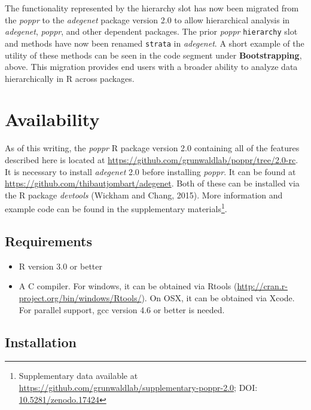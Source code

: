 \documentclass{frontiersSCNS} %
\begin{document}
The functionality represented by the hierarchy slot has now been
migrated from the \emph{poppr} to the \emph{adegenet} package version
2.0 to allow hierarchical analysis in \emph{adegenet}, \emph{poppr}, and
other dependent packages. The prior \emph{poppr} \texttt{hierarchy} slot
and methods have now been renamed \texttt{strata} in \emph{adegenet}. A
short example of the utility of these methods can be seen in the code
segment under \textbf{Bootstrapping}, above. This migration provides end
users with a broader ability to analyze data hierarchically in R across
packages.

\section*{Availability}\label{availability}

As of this writing, the \emph{poppr} R package version 2.0 containing
all of the features described here is located at
\url{https://github.com/grunwaldlab/poppr/tree/2.0-rc}. It is necessary
to install \emph{adegenet} 2.0 before installing \emph{poppr}. It can be
found at \url{https://github.com/thibautjombart/adegenet}. Both of these
can be installed via the R package \emph{devtools} (Wickham and Chang,
2015). More information and example code can be found in the
supplementary materials\footnote{Supplementary data available at
  \url{https://github.com/grunwaldlab/supplementary-poppr-2.0}; DOI:
  \href{http://dx.doi.org/10.5281/zenodo.17424}{10.5281/zenodo.17424}}.

\subsection*{Requirements}\label{requirements}

\begin{itemize}
\itemsep1pt\parskip0pt
\item
  R version 3.0 or better
\item
  A C compiler. For windows, it can be obtained via Rtools
  (\url{http://cran.r-project.org/bin/windows/Rtools/}). On OSX, it can
  be obtained via Xcode. For parallel support, gcc version 4.6 or better
  is needed.
\end{itemize}

\subsection*{Installation}\label{installation}
\end{document}
